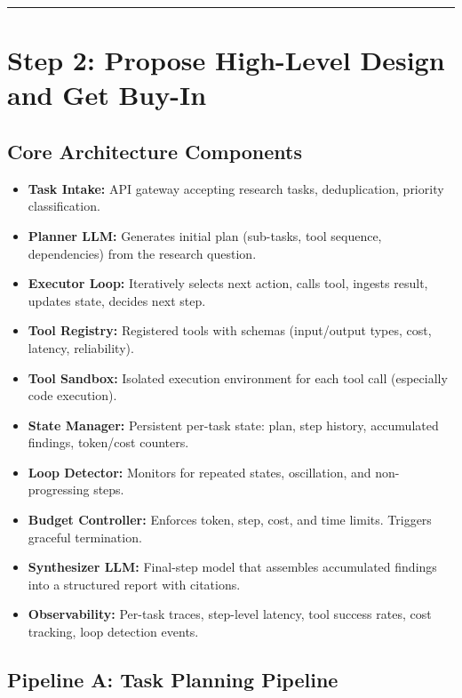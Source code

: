 \bigskip\hrule\bigskip

\section*{Step 2: Propose High-Level Design and Get Buy-In}

\subsection*{Core Architecture Components}

\begin{itemize}
  \item \textbf{Task Intake:} API gateway accepting research tasks, deduplication, priority classification.
  \item \textbf{Planner LLM:} Generates initial plan (sub-tasks, tool sequence, dependencies) from the research question.
  \item \textbf{Executor Loop:} Iteratively selects next action, calls tool, ingests result, updates state, decides next step.
  \item \textbf{Tool Registry:} Registered tools with schemas (input/output types, cost, latency, reliability).
  \item \textbf{Tool Sandbox:} Isolated execution environment for each tool call (especially code execution).
  \item \textbf{State Manager:} Persistent per-task state: plan, step history, accumulated findings, token/cost counters.
  \item \textbf{Loop Detector:} Monitors for repeated states, oscillation, and non-progressing steps.
  \item \textbf{Budget Controller:} Enforces token, step, cost, and time limits. Triggers graceful termination.
  \item \textbf{Synthesizer LLM:} Final-step model that assembles accumulated findings into a structured report with citations.
  \item \textbf{Observability:} Per-task traces, step-level latency, tool success rates, cost tracking, loop detection events.
\end{itemize}

\subsection*{Pipeline A: Task Planning Pipeline}


